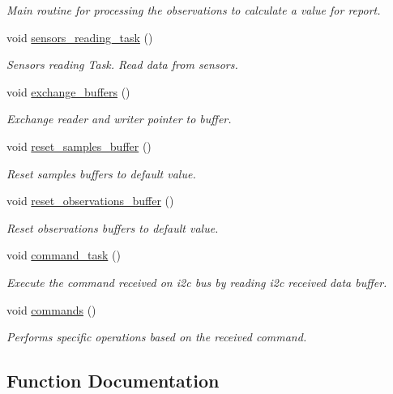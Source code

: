 \begin{DoxyCompactItemize}
\begin{DoxyCompactList}\small\item\em Main routine for processing the observations to calculate a value for report. \end{DoxyCompactList}\item 
void \hyperlink{i2c-th_8ino_ad3efe51e17cb8205a24267c2992a12d4}{sensors\+\_\+reading\+\_\+task} ()
\begin{DoxyCompactList}\small\item\em Sensors reading Task. Read data from sensors. \end{DoxyCompactList}\item 
void \hyperlink{i2c-th_8ino_a46696a96b3118b5d8900703c054166c8}{exchange\+\_\+buffers} ()
\begin{DoxyCompactList}\small\item\em Exchange reader and writer pointer to buffer. \end{DoxyCompactList}\item 
void \hyperlink{i2c-th_8ino_ae176339df7451dc03037f319710575aa}{reset\+\_\+samples\+\_\+buffer} ()
\begin{DoxyCompactList}\small\item\em Reset samples buffers to default value. \end{DoxyCompactList}\item 
void \hyperlink{i2c-th_8ino_adfc6b4ac31f79cb1c99dd2409f05f32d}{reset\+\_\+observations\+\_\+buffer} ()
\begin{DoxyCompactList}\small\item\em Reset observations buffers to default value. \end{DoxyCompactList}\item 
void \hyperlink{i2c-th_8ino_a42389aceb96a84573eb67e6d141cb594}{command\+\_\+task} ()
\begin{DoxyCompactList}\small\item\em Execute the command received on i2c bus by reading i2c received data buffer. \end{DoxyCompactList}\item 
void \hyperlink{i2c-th_8ino_a4981066e183f1432ffd6eddf55826585}{commands} ()
\begin{DoxyCompactList}\small\item\em Performs specific operations based on the received command. \end{DoxyCompactList}\end{DoxyCompactItemize}


\subsection{Function Documentation}
\mbox{\label{i2c-th_8ino_a42389aceb96a84573eb67e6d141cb594}} 
